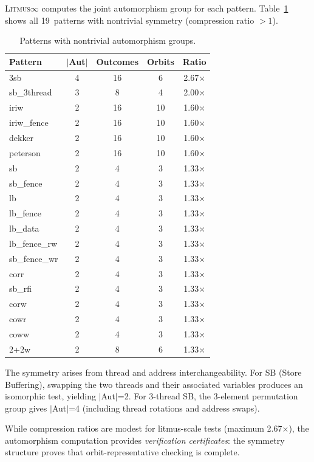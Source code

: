 \documentclass[10pt]{article}
\newcommand{\litmus}{\textsc{Litmus$\infty$}}
\begin{document}
\litmus{} computes the joint automorphism group for each pattern.
Table~\ref{tab:symmetry} shows all 19~patterns with nontrivial
symmetry (compression ratio $> 1$).

\begin{table}[h]
\centering
\caption{Patterns with nontrivial automorphism groups.}
\label{tab:symmetry}
\small
\begin{tabular}{lcccc}
\toprule
\textbf{Pattern} & \textbf{$|$Aut$|$} & \textbf{Outcomes} & \textbf{Orbits} & \textbf{Ratio} \\
\midrule
3sb & 4 & 16 & 6 & 2.67$\times$ \\
sb\_3thread & 3 & 8 & 4 & 2.00$\times$ \\
iriw & 2 & 16 & 10 & 1.60$\times$ \\
iriw\_fence & 2 & 16 & 10 & 1.60$\times$ \\
dekker & 2 & 16 & 10 & 1.60$\times$ \\
peterson & 2 & 16 & 10 & 1.60$\times$ \\
sb & 2 & 4 & 3 & 1.33$\times$ \\
sb\_fence & 2 & 4 & 3 & 1.33$\times$ \\
lb & 2 & 4 & 3 & 1.33$\times$ \\
lb\_fence & 2 & 4 & 3 & 1.33$\times$ \\
lb\_data & 2 & 4 & 3 & 1.33$\times$ \\
lb\_fence\_rw & 2 & 4 & 3 & 1.33$\times$ \\
sb\_fence\_wr & 2 & 4 & 3 & 1.33$\times$ \\
corr & 2 & 4 & 3 & 1.33$\times$ \\
sb\_rfi & 2 & 4 & 3 & 1.33$\times$ \\
corw & 2 & 4 & 3 & 1.33$\times$ \\
cowr & 2 & 4 & 3 & 1.33$\times$ \\
coww & 2 & 4 & 3 & 1.33$\times$ \\
2+2w & 2 & 8 & 6 & 1.33$\times$ \\
\bottomrule
\end{tabular}
\end{table}

The symmetry arises from thread and address interchangeability. For
SB (Store Buffering), swapping the two threads and their associated
variables produces an isomorphic test, yielding $|$Aut$|$=2. For
3-thread SB, the 3-element permutation group gives $|$Aut$|$=4
(including thread rotations and address swaps).

While compression ratios are modest for litmus-scale tests (maximum
2.67$\times$), the automorphism computation provides
\emph{verification certificates}: the symmetry structure proves
that orbit-representative checking is complete.
\end{document}
